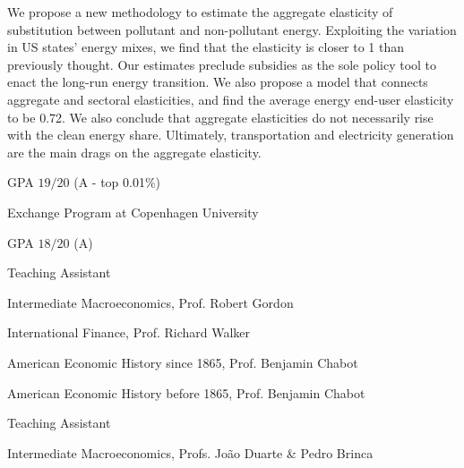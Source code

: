 \documentclass{practical-resume}
\begin{document}
	\begin{cvabstract}
	We propose a new methodology to estimate the aggregate elasticity of substitution between pollutant and non-pollutant energy. Exploiting the variation in US states' energy mixes, we find that the elasticity is closer to 1 than previously thought. Our estimates preclude subsidies as the sole policy tool to enact the long-run energy transition. We also propose a model that connects aggregate and sectoral elasticities, and find the average energy end-user elasticity to be 0.72. We also conclude that aggregate elasticities do not necessarily rise with the clean energy share. Ultimately, transportation and electricity generation are the main drags on the aggregate elasticity. 
	\end{cvabstract}
	

	\begin{position}{}{}
		\item GPA $19/20$ (A - top 0.01\%)
		\item Exchange Program at Copenhagen University
	\end{position}

	\begin{position}{}{}
		\item GPA $18/20$ (A)
	\end{position}


	\begin{position}{Teaching Assistant}{}
		\item Intermediate Macroeconomics, Prof. Robert Gordon
		\item International Finance, Prof. Richard Walker
		\item American Economic History since 1865, Prof. Benjamin Chabot
		\item American Economic History before 1865, Prof. Benjamin Chabot
	\end{position}
	
	\begin{position}{Teaching Assistant}{}
		\item Intermediate Macroeconomics, Profs. João Duarte \& Pedro Brinca
	\end{position}
\end{document}
